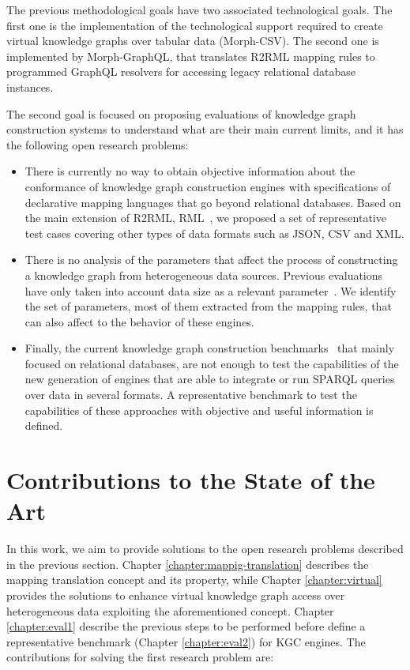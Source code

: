The previous methodological goals have two associated technological goals. The first one is the implementation of the technological support required to create virtual knowledge graphs over tabular data (Morph-CSV). The second one is implemented by Morph-GraphQL, that translates R2RML mapping rules to programmed GraphQL resolvers for accessing legacy relational database instances.

The second goal is focused on proposing evaluations of knowledge graph construction systems to understand what are their main current limits, and it has the following open research problems:
\begin{itemize}
    \item There is currently no way to obtain objective information about the conformance of knowledge graph construction engines with specifications of declarative mapping languages that go beyond relational databases. Based on the main extension of R2RML, RML~\citep{dimou2014rml}, we proposed a set of representative test cases covering other types of data formats such as JSON, CSV and XML.
    \item There is no analysis of the parameters that affect the process of constructing a knowledge graph from heterogeneous data sources. Previous evaluations have only taken into account data size as a relevant parameter~\citep{lefranccois2017sparql,csimcsek2019rocketrml}. We identify the set of parameters, most of them extracted from the mapping rules, that can also affect to the behavior of these engines.
    \item Finally, the current knowledge graph construction benchmarks~\citep{lanti2015npd,bizer2009berlin} that mainly focused on relational databases, are not enough to test the capabilities of the new generation of engines that are able to integrate or run SPARQL queries over data in several formats. A representative benchmark to test the capabilities of these approaches with objective and useful information is defined.
\end{itemize}



\section{Contributions to the State of the Art}
In this work, we aim to provide solutions to the open research problems described in the previous section. Chapter \ref{chapter:mappig-translation} describes the mapping translation concept and its property, while Chapter \ref{chapter:virtual} provides the solutions to enhance virtual knowledge graph access over heterogeneous data exploiting the aforementioned concept. Chapter \ref{chapter:eval1} describe the previous steps to be performed before define a representative benchmark (Chapter \ref{chapter:eval2}) for KGC engines. The contributions for solving the first research problem are:

